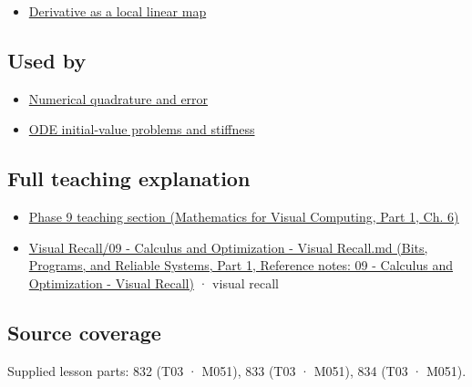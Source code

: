 \begin{itemize}
\tightlist
\item
  \hyperref[appendix-7bc181935c42]{Derivative as a local linear map}
\end{itemize}

\subsection{Used by}\label{appendix-1a50e72435c2-used-by}

\hypertarget{appendix-1a50e72435c2-used-by}{}

\begin{itemize}
\tightlist
\item
  \hyperref[appendix-80521eae6b71]{Numerical quadrature and error}
\item
  \hyperref[appendix-e8ab9836882e]{ODE initial-value problems and stiffness}
\end{itemize}

\subsection{Full teaching explanation}\label{appendix-1a50e72435c2-full-teaching-explanation}

\hypertarget{appendix-1a50e72435c2-full-teaching-explanation}{}

\begin{itemize}
\tightlist
\item
  \href{../02-Mathematics-for-Visual-Computing-P01/main.pdf\#nameddest=02-foundations-ii-ch022-integration-and-quadrature}{Phase 9 teaching section (Mathematics for Visual Computing, Part 1, Ch. 6)}
\item
  \href{../01-Bits-Programs-and-Reliable-Systems-P01/main.pdf\#nameddest=appendix-adf48f5dc5c1}{Visual Recall/09 - Calculus and Optimization - Visual Recall.md (Bits, Programs, and Reliable Systems, Part 1, Reference notes: 09 - Calculus and Optimization - Visual Recall)} · visual recall
\end{itemize}

\subsection{Source coverage}\label{appendix-1a50e72435c2-source-coverage}

\hypertarget{appendix-1a50e72435c2-source-coverage}{}

Supplied lesson parts: 832 (T03 · M051), 833 (T03 · M051), 834 (T03 · M051).
